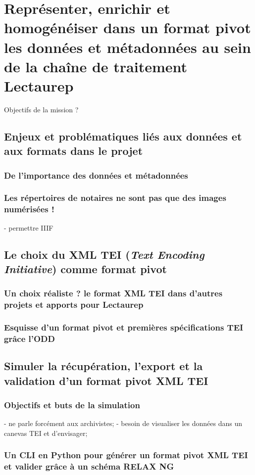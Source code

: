 \part{Représenter, enrichir et homogénéiser dans un format pivot les données et métadonnées au sein de la chaîne de traitement Lectaurep}

Objectifs de la mission ? 

\chapter{Enjeux et problématiques liés aux données et aux formats dans le projet}
\section{De l'importance des données et métadonnées}
\section{Les répertoires de notaires ne sont pas que des images numérisées !}
- permettre IIIF

\chapter{Le choix du XML TEI (\textit{Text Encoding Initiative}) comme format pivot}
\section{Un choix réaliste ? le format XML TEI dans d'autres projets et apports pour Lectaurep}
\section{Esquisse d'un format pivot et premières spécifications TEI grâce l'ODD}

\chapter{Simuler la récupération, l'export et la validation d'un format pivot XML TEI}
\section{Objectifs et buts de la simulation}
- ne parle forcément aux archivistes;
- besoin de visualiser les données dans un canevas TEI et d'envisager;
\section{Un CLI en Python pour générer un format pivot XML TEI et valider grâce à un schéma RELAX NG}